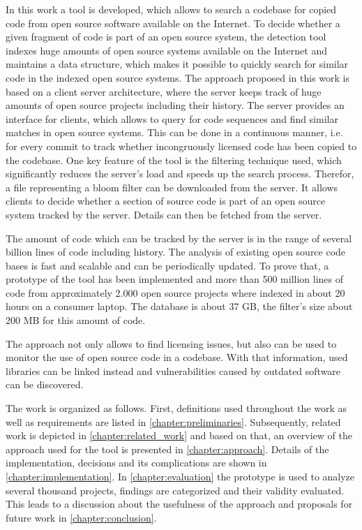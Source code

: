 In this work a tool is developed, which allows to search a codebase for copied code from open source software available on the Internet.
To decide whether a given fragment of code is part of an open source system, the detection tool indexes huge amounts of open source systems available on the Internet and maintains a data structure, which makes it possible to quickly search for similar code in the indexed open source systems.
The approach proposed in this work is based on a client server architecture, where the server keeps track of huge amounts of open source projects including their history.
The server provides an interface for clients, which allows to query for code sequences and find similar matches in open source systems.
This can be done in a continuous manner, i.e. for every commit to track whether incongruously licensed code has been copied to the codebase.
One key feature of the tool is the filtering technique used, which significantly reduces the server's load and speeds up the search process.
Therefor, a file representing a bloom filter can be downloaded from the server.
It allows clients to decide whether a section of source code is part of an open source system tracked by the server.
Details can then be fetched from the server.

The amount of code which can be tracked by the server is in the range of several billion lines of code including history.
The analysis of existing open source code bases is fast and scalable and can be periodically updated.
To prove that, a prototype of the tool has been implemented and more than 500 million lines of code from approximately 2.000 open source projects where indexed in about 20 hours on a consumer laptop.
The database is about 37 GB, the filter's size about 200 MB for this amount of code.

The approach not only allows to find licensing issues, but also can be used to monitor the use of open source code in a codebase.
With that information, used libraries can be linked instead and vulnerabilities caused by outdated software can be discovered.

The work is organized as follows.
First, definitions used throughout the work as well as requirements are listed in \autoref{chapter:preliminaries}.
Subsequently, related work is depicted in \autoref{chapter:related_work} and based on that, an overview of the approach used for the tool is presented in \autoref{chapter:approach}.
Details of the implementation, decisions and its complications are shown in \autoref{chapter:implementation}.
In \autoref{chapter:evaluation} the prototype is used to analyze several thousand projects, findings are categorized and their validity evaluated.
This leads to a discussion about the usefulness of the approach and proposals for future work in \autoref{chapter:conclusion}.